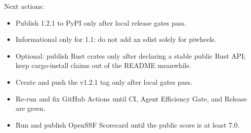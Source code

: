 \noindent Next actions:
\begin{itemize}
\item Publish 1.2.1 to PyPI only after local release gates pass.
\item Informational only for 1.1: do not add an sdist solely for piwheels.
\item Optional: publish Rust crates only after declaring a stable public Rust API; keep cargo-install claims out of the README meanwhile.
\item Create and push the v1.2.1 tag only after local gates pass.
\item Re-run and fix GitHub Actions until CI, Agent Efficiency Gate, and Release are green.
\item Run and publish OpenSSF Scorecard until the public score is at least 7.0.
\end{itemize}
